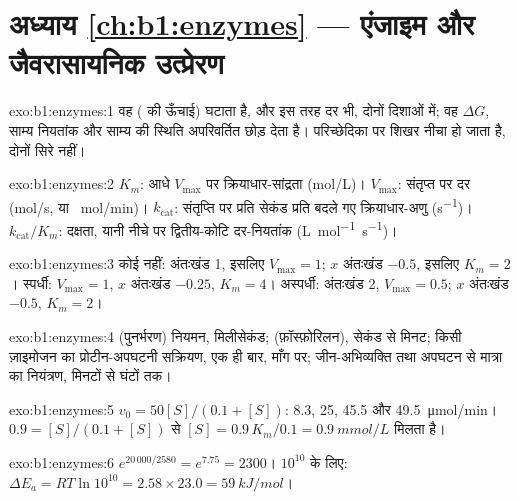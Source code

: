 \section*{अध्याय \ref{ch:b1:enzymes} --- एंजाइम और जैवरासायनिक उत्प्रेरण}

\begin{solution}{exo:b1:enzymes:1}
वह  ( की ऊँचाई) घटाता है, और इस तरह दर भी,
दोनों दिशाओं में; वह $\Delta G$, साम्य नियतांक और साम्य की स्थिति
अपरिवर्तित छोड़ देता है। परिच्छेदिका पर शिखर नीचा हो जाता है, दोनों सिरे
नहीं।
\end{solution}

\begin{solution}{exo:b1:enzymes:2}
$K_m$: आधे $V_{\max}$ पर क्रियाधार-सांद्रता (\unit{mol/L})।
$V_{\max}$: संतृप्त  पर दर (\unit{mol/s}, या \unit{\micro
mol/min})। $k_{\mathrm{cat}}$: संतृप्ति पर प्रति सेकंड प्रति  बदले गए
क्रियाधार-अणु (\unit{s^{-1}})। $k_{\mathrm{cat}}/K_m$: दक्षता,
यानी नीचे  पर द्वितीय-कोटि दर-नियतांक
(\unit{L.mol^{-1}.s^{-1}})।
\end{solution}

\begin{solution}{exo:b1:enzymes:3}
कोई  नहीं: अंतःखंड 1, इसलिए $V_{\max} = 1$; $x$ अंतःखंड $-0.5$,
इसलिए $K_m = 2$। स्पर्धी: $V_{\max} = 1$, $x$ अंतःखंड $-0.25$, $K_m = 4$।
अस्पर्धी: अंतःखंड 2, $V_{\max} = 0.5$; $x$ अंतःखंड $-0.5$,
$K_m = 2$।
\end{solution}

\begin{solution}{exo:b1:enzymes:4}
 (पुनर्भरण) नियमन, मिलीसेकंड; 
(फ़ॉस्फ़ोरिलन), सेकंड से मिनट; किसी ज़ाइमोजन का प्रोटीन-अपघटनी सक्रियण,
एक ही बार, माँग पर; जीन-अभिव्यक्ति तथा अपघटन से मात्रा का नियंत्रण,
मिनटों से घंटों तक।
\end{solution}

\begin{solution}{exo:b1:enzymes:5}
$v_0 = 50[S]/(0.1 + [S])$: 8.3, 25, 45.5 और \qty{49.5}{\micro mol/min}।
$0.9 = [S]/(0.1 + [S])$ से $[S] = 0.9\,K_m/0.1 = \qty{0.9}{mmol/L}$ मिलता है।
\end{solution}

\begin{solution}{exo:b1:enzymes:6}
$e^{20\,000/2580} = e^{7.75} = 2300$। $10^{10}$ के लिए: $\Delta E_a =
RT\ln 10^{10} = 2.58\times 23.0 = \qty{59}{kJ/mol}$।
\end{solution}

